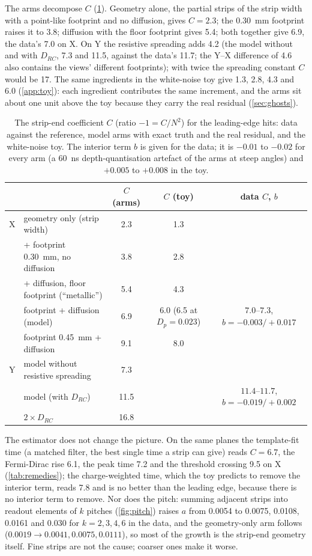 The arms decompose $C$ (\cref{tab:arms}). Geometry alone, the partial strips of the strip width with a point-like footprint and
no diffusion, gives $C = 2.3$; the \SI{0.30}{mm} footprint raises it to 3.8; diffusion with the floor footprint gives 5.4; both
together give 6.9, the data's 7.0 on X. On Y the resistive spreading adds 4.2 (the model without and with $D_{RC}$, 7.3 and
11.5, against the data's 11.7; the Y--X difference of 4.6 also contains the views' different footprints); with twice the
spreading constant $C$ would be 17. The same ingredients in the white-noise toy give 1.3, 2.8, 4.3 and 6.0
(\cref{app:toy}): each ingredient contributes the same increment, and the arms sit about one unit above the toy because they
carry the real residual (\cref{sec:ghosts}).

\begin{table}[t]
  \centering\small
  \caption{The strip-end coefficient $C$ (ratio $-1 = C/N^2$) for the leading-edge hits: data against the reference, model
  arms with exact truth and the real residual, and the white-noise toy. The interior term $b$ is given for the data; it is
  $-0.01$ to $-0.02$ for every arm (a \SI{60}{ns} depth-quantisation artefact of the arms at steep angles) and $+0.005$ to
  $+0.008$ in the toy.}
  \label{tab:arms}
  \begin{tabular}{@{}llccc@{}}
    \toprule
    & & $C$ (arms) & $C$ (toy) & data $C$, $b$ \\
    \midrule
    X & geometry only (strip width) & 2.3 & 1.3 & \\
      & + footprint \SI{0.30}{mm}, no diffusion & 3.8 & 2.8 & \\
      & + diffusion, floor footprint (``metallic'') & 5.4 & 4.3 & \\
      & footprint + diffusion (model) & 6.9 & 6.0 (6.5 at $D_p = 0.023$) & $7.0$--$7.3$, $b = -0.003/+0.017$ \\
      & footprint \SI{0.45}{mm} + diffusion & 9.1 & 8.0 & \\
    Y & model without resistive spreading & 7.3 & & \\
      & model (with $D_{RC}$) & 11.5 & & $11.4$--$11.7$, $b = -0.019/+0.002$ \\
      & $2\times D_{RC}$ & 16.8 & & \\
    \bottomrule
  \end{tabular}
\end{table}

The estimator does not change the picture. On the same planes the template-fit time (a matched filter, the best single time a
strip can give) reads $C = 6.7$, the Fermi-Dirac rise 6.1, the peak time 7.2 and the threshold crossing 9.5 on X
(\cref{tab:remedies}); the charge-weighted time, which the toy predicts to remove the interior term, reads 7.8 and is no
better than the leading edge, because there is no interior term to remove. Nor does the pitch: summing adjacent strips into
readout elements of $k$ pitches (\cref{fig:pitch}) raises $a$ from 0.0054 to 0.0075, 0.0108, 0.0161 and 0.030 for $k = 2, 3, 4, 6$
in the data, and the geometry-only arm follows ($0.0019 \to 0.0041, 0.0075, 0.0111$), so most of the growth is the strip-end
geometry itself. Fine strips are not the cause; coarser ones make it worse.

